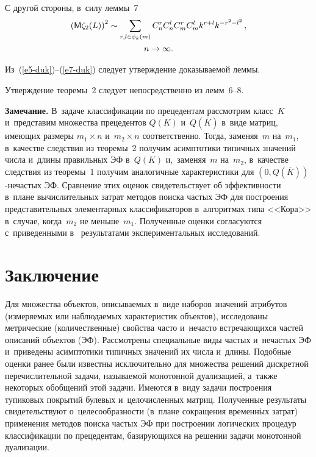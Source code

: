 \begin{multicols}{2}
  С другой стороны, в~силу леммы~7
  \begin{multline}
  \left( {\sf M}\zeta_2(L)\right)^2 \sim \sum\limits_{r,l\in\phi_k(m)} C_n^r C_n^l C_m^r 
C_m^l k^{r+l} k^{-r^2-l^2}\,,\\ n\to \infty.
  \label{e7-duk}
  \end{multline}
  
  Из~(\ref{e5-duk})--(\ref{e7-duk}) следует утверждение доказываемой леммы.
  
  \smallskip
  
  Утверждение теоремы~2 следует непосредственно из лемм~6--8.
  
  \smallskip
  
  \noindent
  \textbf{Замечание.} В~задаче классификации по прецедентам рассмотрим 
класс~$K$ и~представим множества прецедентов $Q(K)$ и~$Q(\overline{K})$ 
в~виде матриц, имеющих размеры $m_1\times n$ и~$m_2\times n$ соответственно. 
Тогда, заменяя~$m$ на~$m_1$, в~качестве следствия из теоремы~2 получим 
асимптотики типичных значений чис\-ла и~длины правильных ЭФ в~$Q(K)$ 
и,~заменяя~$m$ на~$m_2$, в~качестве следствия из тео\-ре\-мы~1 получим 
аналогичные характеристики для $(0,Q(\overline{K}))$-не\-час\-тых ЭФ. 
Сравнение этих оценок свидетельствует об эффективности в~плане 
вычислительных затрат методов поиска частых ЭФ для построения 
представительных элементарных классификаторов в~алгоритмах типа 
<<Кора>> в~случае, когда~$m_2$ не меньше~$m_1$. Полученные оценки 
согласуются с~приведенными в~\cite{12-duk} результатами 
экспериментальных исследований.
  
\section{Заключение}

  Для множества объектов, описываемых в~виде наборов значений атрибутов 
(измеряемых или наблюдаемых характеристик объектов), исследованы 
метрические (количественные) свойства часто и~нечасто встречающихся частей 
описаний объектов (ЭФ). Рассмотрены специальные 
виды час\-тых и~не\-час\-тых ЭФ и~приведены асимптотики 
типичных значений их чис\-ла и~длины. Подобные оценки ранее были известны 
исключительно для множества решений дискретной перечислительной задачи, 
называемой монотонной дуализацией, а~так\-же некоторых обобщений этой 
задачи. Име\-ют\-ся в~виду задачи построения тупиковых покрытий булевых 
и~целочисленных матриц. Полученные результаты свидетельствуют 
о~це\-ле\-со\-об\-раз\-ности (в~плане сокращения временн$\acute{\mbox{ы}}$х затрат) применения 
методов поиска час\-тых ЭФ при по\-стро\-ении логических 
процедур классификации по прецедентам, ба\-зи\-ру\-ющих\-ся на решении задачи 
монотонной дуализации.
  

\end{multicols}
